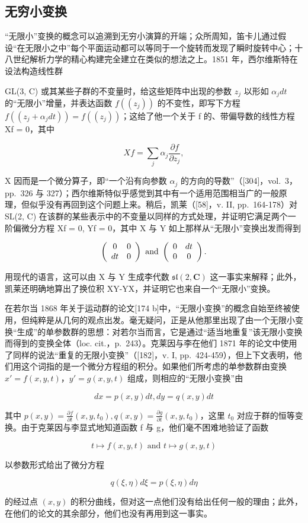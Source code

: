 \subsection{无穷小变换}

“无限小”变换的概念可以追溯到无穷小演算的开端；众所周知，笛卡儿通过假设“在无限小之中”每个平面运动都可以等同于一个旋转而发现了瞬时旋转中心；十八世纪解析力学的精心构建完全建立在类似的想法之上。1851 年，西尔维斯特在设法构造线性群

GL(3, C) 或其某些子群的不变量时，给这些矩阵中出现的参数 \(z_{j}\) 以形如 \(\alpha_{j}dt\) 的“无限小”增量，并表达函数 \(f((z_{j}))\) 的不变性，即写下方程 \(f((z_{j} + \alpha_{j}dt)) = f((z_{j}))\)；这给了他一个关于 f 的、带偏导数的线性方程 Xf = 0，其中

\[
X f = \sum_ {j} \alpha_ {j} \frac {\partial f}{\partial z _ {j}},\tag{25.1}
\]

X 因而是一个微分算子，即“一个沿有向参数 \(\alpha_{j}\) 的方向的导数”（{[}304{]}，vol.~3，pp.~326 与 327）；西尔维斯特似乎感觉到其中有一个适用范围相当广的一般原理，但似乎没有再回到这个问题上来。稍后，凯莱（{[}58{]}，v. II, pp.~164-178）对 SL(2, C) 在该群的某些表示中的不变量以同样的方式处理，并证明它满足两个一阶偏微分方程 Xf = 0, Yf = 0，其中 X 与 Y 如上那样从“无限小”变换出发而得到

\[
\left( \begin{array}{c c} 0 & 0 \\ d t & 0 \end{array} \right) \text {   and   } \left( \begin{array}{c c} 0 & d t \\ 0 & 0 \end{array} \right).
\]

用现代的语言，这可以由 X 与 Y 生成李代数 \(\mathfrak{sl}(2,\mathbf{C})\) 这一事实来解释；此外，凯莱还明确地算出了换位积 XY-YX，并证明它也来自一个“无限小”变换。

在若尔当 1868 年关于运动群的论文{[}174 b{]}中，“无限小变换”的概念自始至终被使用，但纯粹是从几何的观点出发。毫无疑问，正是从他那里出现了由一个无限小变换“生成”的单参数群的思想：对若尔当而言，它是通过“适当地重复”该无限小变换而得到的变换全体（loc. cit.，p.~243）。克莱因与李在他们 1871 年的论文中使用了同样的说法“重复的无限小变换”（{[}182{]}，v. I, pp.~424-459），但上下文表明，他们用这个词指的是一个微分方程组的积分。如果他们所考虑的单参数群由变换 \(x' = f(x, y, t)\)，\(y' = g(x, y, t)\) 组成，则相应的“无限小变换”由

\[
d x = p (x, y) d t, d y = q (x, y) d t
\]

其中 \(p(x,y)=\frac{\partial f}{\partial t}(x,y,t_{0}),q(x,y)=\frac{\partial g}{\partial t}(x,y,t_{0})\)，这里 \(t_{0}\) 对应于群的恒等变换。由于克莱因与李显式地知道函数 f 与 g，他们毫不困难地验证了函数

\[
t \mapsto f (x, y, t) \text {   and   } t \mapsto g (x, y, t)
\]

以参数形式给出了微分方程

\[
q (\xi , \eta) d \xi = p (\xi , \eta) d \eta
\]

的经过点 \((x,y)\) 的积分曲线，但对这一点他们没有给出任何一般的理由；此外，在他们的论文的其余部分，他们也没有再用到这一事实。

